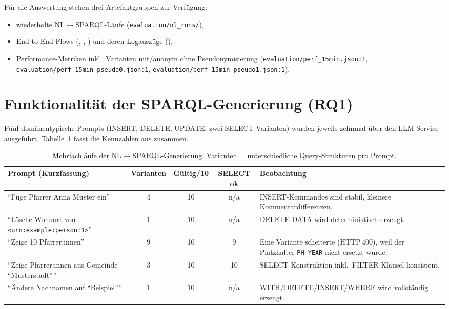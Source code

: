 Für die Auswertung stehen drei Artefaktgruppen zur Verfügung:
\begin{itemize}
  \item wiederholte NL$\rightarrow$SPARQL-Läufe (\texttt{evaluation/nl\_runs/}),
\item End-to-End-Flows (, , ) und deren Logauszüge (),
  \item Performance-Metriken inkl.\ Varianten mit/anonym ohne Pseudonymisierung (\texttt{evaluation/perf\_15min.json:1}, \texttt{evaluation/perf\_15min\_pseudo0.json:1}, \texttt{evaluation/perf\_15min\_pseudo1.json:1}).
\end{itemize}

\section{Funktionalität der SPARQL-Generierung (RQ1)}

Fünf domänentypische Prompts (INSERT, DELETE, UPDATE, zwei SELECT-Varianten) wurden jeweils zehnmal über den LLM-Service ausgeführt. Tabelle~\ref{tab:nl-eval} fasst die Kennzahlen aus  zusammen.

\begin{table}[ht]
  \centering
  \begin{tabularx}{\textwidth}{>{\raggedright\arraybackslash}X c c c >{\raggedright\arraybackslash}X}
    \toprule
    Prompt (Kurzfassung) & Varianten & Gültig/10 & SELECT ok & Beobachtung \\
    \midrule
    \enquote{Füge Pfarrer Anna Muster ein} & 4 & 10 & n/a & INSERT-Kommandos sind stabil, kleinere Kommentardifferenzen.\\
    \enquote{Lösche Wohnort von \texttt{<urn:example:person:1>}} & 1 & 10 & n/a & DELETE DATA wird deterministisch erzeugt.\\
    \enquote{Zeige 10 Pfarrer:innen} & 9 & 10 & 9 & Eine Variante scheiterte (HTTP\,400), weil der Platzhalter \texttt{PH\_YEAR} nicht ersetzt wurde.\\
    \enquote{Zeige Pfarrer:innen aus Gemeinde ``Musterstadt''} & 3 & 10 & 10 & SELECT-Konstruktion inkl.\ FILTER-Klausel konsistent.\\
    \enquote{Ändere Nachnamen auf ``Beispiel''} & 1 & 10 & n/a & WITH/DELETE/INSERT/WHERE wird vollständig erzeugt.\\
    \bottomrule
  \end{tabularx}
  \caption[NL$\rightarrow$SPARQL-Läufe]{Mehrfachläufe der NL$\rightarrow$SPARQL-Generierung. Varianten = unterschiedliche Query-Strukturen pro Prompt.}
  \label{tab:nl-eval}
\end{table}

